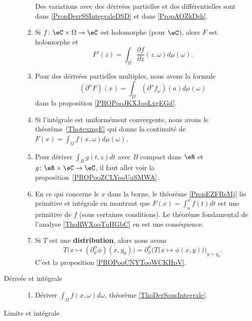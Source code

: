 \begin{description}
\begin{enumerate}
			      Des variations avec des dérivées partielles et des différentielles sont dans \ref{PropDerrSSIntegraleDSD} et dans \ref{PropAOZkDsh}.
			\item
			      Si \( f\colon \eC\times \Omega\to \eC\) est holomorphe (pour \( \eC\)), alors \( F\) est holomorphe et
			      \begin{equation}
				      F'(z)=\int_{\Omega}\frac{ \partial f }{ \partial z }(z,\omega)d\mu(\omega).
			      \end{equation}
			\item
			      Pour des dérivées partielles multiples, nous avons la formule
			      \begin{equation}
				      (\partial^{\alpha}F)(x)=\int_{\Omega}(\partial^{\alpha}f_{\omega})(a)d\mu(\omega)
			      \end{equation}
			      dans la proposition \ref{PROPooJKXJooLxgEGd}.
			\item
			      Si l'intégrale est uniformément convergente, nous avons le théorème~\ref{ThotexmgE} qui donne la continuité de \( F(x)=\int_{\Omega}f(x,\omega)d\mu(\omega)\).
			\item
			      Pour dériver \( \int_Bg(t,z)dt\) avec \( B\) compact dans \( \eR\) et \( g\colon \eR\times \eC\to \eC\), il faut aller voir la proposition~\ref{PROPooZCLYooUaSMWA}.
			\item
			      En ce qui concerne le \( x\) dans la borne, le théorème \ref{PropEZFRsMj} lie primitive et intégrale en montrant que \( F(x)=\int_a^xf(t)dt\) est une primitive de \( f\) (sous certaines conditions). Le théorème fondamental de l'analyse \ref{ThoRWXooTqHGbC} en est une conséquence.
			\item Si \( T\) est une \textbf{distribution}, alors nous avons
			      \begin{equation}
				      T\big( x\mapsto (\partial_y^{\alpha}\phi)(x,y_0) \big)=\partial_y^{\alpha}\Big( T\big( x\mapsto \phi(x,y) \big) \Big)_{y=y_0}.
			      \end{equation}
			      C'est la proposition \ref{PROPooCNYTooWCKHpV}.
		\end{enumerate}
	\item[Dérivée et intégrale]
		\begin{enumerate}
			\item
			      Dériver \( \int_{\Omega}f(x,\omega)d\omega\), théorème \ref{ThoDerSousIntegrale}.
		\end{enumerate}
	\item[Limite et intégrale]
		\begin{enumerate}

\end{enumerate}
\end{description}
